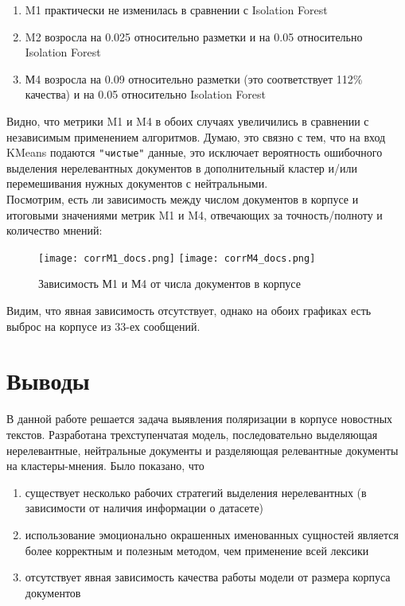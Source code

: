 \documentclass{article}
\begin{document}
\begin{enumerate}
    \item M1 практически не изменилась в сравнении с Isolation Forest
    \item M2 возросла на 0.025 относительно разметки и на 0.05 относительно Isolation Forest
    \item М4 возросла на 0.09 относительно разметки (это соответствует 112\% качества) и на 0.05 относительно Isolation Forest
\end{enumerate}

Видно, что метрики M1 и M4 в обоих случаях увеличились в сравнении с независимым применением алгоритмов. Думаю, это связно с тем, что на вход KMeans подаются \verb|"чистые"| данные, это исключает вероятность ошибочного выделения нерелевантных документов в дополнительный кластер и/или перемешивания нужных документов с нейтральными.\\

Посмотрим, есть ли зависимость между числом документов в корпусе и итоговыми значениями метрик M1 и M4, отвечающих за точность/полноту и количество мнений:

\begin{figure}[!htb]
        \texttt{[image: corrM1\_docs.png]}
        \texttt{[image: corrM4\_docs.png]}
        \caption{Зависимость М1 и  М4 от числа документов в корпусе}
\end{figure}

Видим, что явная зависимость отсутствует, однако на обоих графиках есть выброс на корпусе из 33-ех сообщений.\\

\section{Выводы}
В данной работе решается задача выявления поляризации в корпусе новостных текстов. Разработана трехступенчатая модель, последовательно выделяющая нерелевантные, нейтральные документы и разделяющая релевантные документы на кластеры-мнения. Было показано, что
\begin{enumerate}
    \item существует несколько рабочих стратегий выделения нерелевантных (в зависимости от наличия информации о датасете)
    \item использование эмоционально окрашенных именованных сущностей является более корректным и полезным методом, чем применение всей лексики
    \item отсутствует явная зависимость качества работы модели от размера корпуса документов
\end{enumerate}
\end{document}
